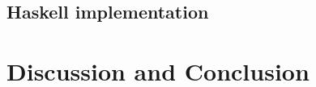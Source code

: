 \subsection{Haskell implementation}\label{Haskell implementation}

\section{Discussion and Conclusion}












  
  

















